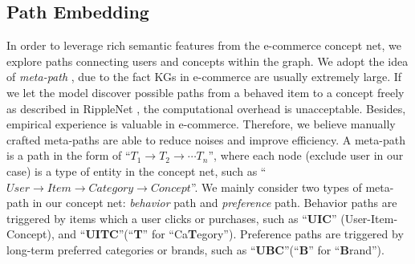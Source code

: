 \subsection{Path Embedding}
\label{sec:path}
In order to leverage rich semantic features from the e-commerce concept net,
we explore paths connecting users and concepts within the graph.
We adopt the idea of \textit{meta-path} \cite{hu2018leveraging}, due to the fact KGs in e-commerce are usually extremely large.
If we let the model discover possible paths from a behaved item to a concept freely as described in RippleNet \cite{wang2018ripplenet}, 
the computational overhead is unacceptable.
Besides, empirical experience is valuable in e-commerce.
Therefore, we believe manually crafted meta-paths are able to reduce noises and improve efficiency.
A meta-path is a path in the form of ``$T_1 \rightarrow T_2 \rightarrow \cdots T_n$'', where each node (exclude user in our case) is a type of entity in the concept net, such as ``$User \rightarrow Item \rightarrow Category \rightarrow Concept$''.
We mainly consider two types of meta-path in our concept net: \textit{behavior} path and \textit{preference} path.
Behavior paths are triggered by items which a user clicks or purchases, such as ``\textbf{UIC}'' (User-Item-Concept), and  ``\textbf{UITC}''(``\textbf{T}'' for ``Ca\textbf{T}egory'').
Preference paths are triggered by long-term preferred categories or brands, such as ``\textbf{UBC}''(``\textbf{B}'' for ``\textbf{B}rand'').

